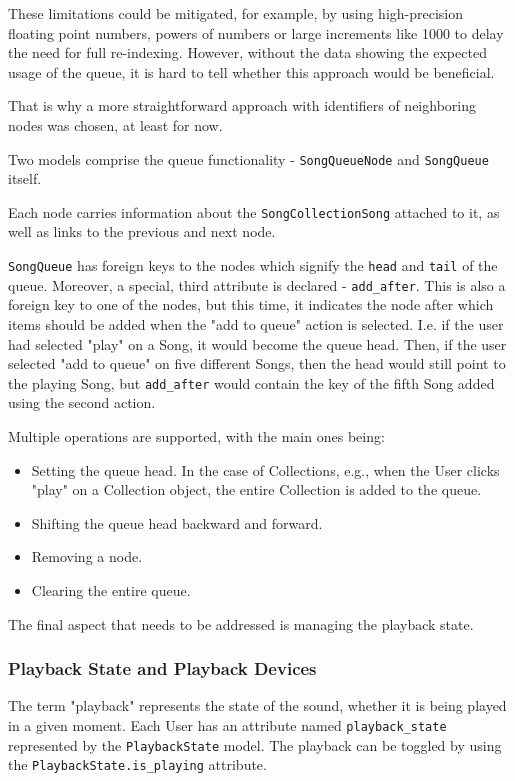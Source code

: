 These limitations could be mitigated, for example, by using high-precision floating point numbers,
powers of numbers or large increments like 1000 to delay the need for full re-indexing.
However, without the data showing the expected usage of the queue, it is hard to tell whether this approach would
be beneficial.

That is why a more straightforward approach with identifiers of neighboring nodes was chosen, at least for now.

Two models comprise the queue functionality - \texttt{SongQueueNode} and \texttt{SongQueue} itself.

Each node carries information about the \texttt{SongCollectionSong} attached to it, as well as
links to the previous and next node.

\texttt{SongQueue} has foreign keys to the nodes which signify the \texttt{head} and \texttt{tail} of the queue.
Moreover, a special, third attribute is declared - \texttt{add\_after}. This is also
a foreign key to one of the nodes, but this time, it indicates the node after which items
should be added when the "add to queue" action is selected.
I.e. if the user had selected "play" on a Song, it would become the queue head.
Then, if the user selected "add to queue" on five different Songs,
then the head would still point to the playing Song, but \texttt{add\_after} would
contain the key of the fifth Song added using the second action.

Multiple operations are supported, with the main ones being:
\begin{itemize}
    \item Setting the queue head. In the case of Collections, e.g.,
    when the User clicks "play" on a Collection object, the entire Collection is added to the queue.
    \item Shifting the queue head backward and forward.
    \item Removing a node.
    \item Clearing the entire queue.
\end{itemize}


The final aspect that needs to be addressed is managing the playback state.

\subsubsection{Playback State and Playback Devices}
The term "playback" represents the state of the sound, whether it is being played in a given moment.
Each User has an attribute named \texttt{playback\_state} represented by the \texttt{PlaybackState} model.
The playback can be toggled by using the \texttt{PlaybackState.is\_playing} attribute.

